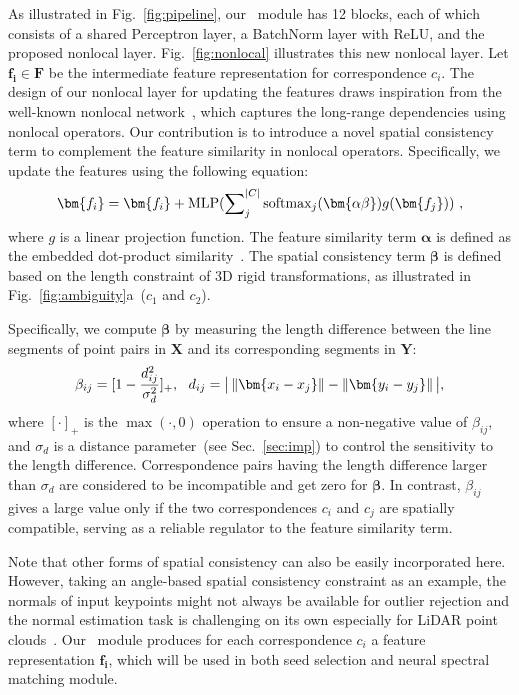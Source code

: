 {As illustrated in Fig.~\ref{fig:pipeline}}, our \nonlocal~module has 12 blocks, each of which consists of a shared Perceptron layer, a BatchNorm layer with ReLU, and the proposed nonlocal layer. Fig.~\ref{fig:nonlocal} {illustrates this new nonlocal layer}. Let $\bm{f_i} \in \bm{F}$ be the intermediate {feature} representation for correspondence $c_i$. {The design of our nonlocal layer {for updating the features} draws inspiration from the well-known nonlocal network~\cite{wang2018non}, {which captures the long-range dependencies using nonlocal operators.}
Our contribution is to introduce a novel {spatial consistency term to complement the feature similarity in nonlocal operators.}
Specifically, we update the features using the following equation:  }
\begin{equation}
\setlength\abovedisplayskip{3.5pt}\setlength\belowdisplayskip{3.5pt}
\bm{f_i} = \bm{f_i} + \text{MLP}(\sum\nolimits_{j}^{|C|}\text{softmax}_j(\bm{\alpha\beta}) g(\bm{f_j})) ~,
	\label{eq:nonlocal}
\end{equation}
where $g$ is a linear projection function. The feature similarity term $\bm{\alpha}$ is defined as the embedded dot-product similarity~\cite{wang2018non}.
The {spatial consistency} term $\bm{\beta}$ {is defined based on} the {length constraint} of 3D rigid transformations, 
as illustrated in Fig.~\ref{fig:ambiguity}a~($c_1$ and $c_2$). 


Specifically, we {compute} $\bm{\beta}$ by measuring the {length difference} {between the line segments of point pairs in $\mathbf{X}$ and its corresponding segments in $\mathbf{Y}$:} 
\begin{equation}
\setlength\abovedisplayskip{2pt}
\setlength\belowdisplayskip{2.5pt}
    \beta_{ij} = [1 - \frac{d_{ij}^2}{\sigma_d^2}]_+, ~~
d_{ij} = \big | \left\Vert \bm{x_i-x_j}\right\Vert - \left\Vert \bm{y_i-y_j}\right\Vert \big |,
    \label{eq:spatial_consistency}
\end{equation}
where $[\cdot]_+$ is the $\max (\cdot, 0)$ operation to ensure {a non-negative value of $\beta_{ij}$}, and $\sigma_d$ is a {distance} parameter~(see Sec.~\ref{sec:imp}) to control the sensitivity to the length difference. Correspondence pairs having the length difference larger than $\sigma_d$ are considered to be incompatible and get zero for $\bm{\beta}$. 
In contrast, ${\beta}_{ij}$ gives a large value only if the two correspondences {$c_i$ and $c_j$} are spatially compatible, serving as a reliable regulator to the feature similarity term. 

Note that other forms of spatial consistency can also be easily incorporated here. However, taking 
{an angle-based spatial consistency} constraint as an example, the normals of input keypoints might not {always} be available {for} outlier rejection and the normal estimation {task is challenging on its own} especially for LiDAR point clouds~\cite{zhao2019robust}.
Our \nonlocal~module produces {for each correspondence $c_i$} a feature representation $\bm{f_i}$, which will be used in both seed selection and neural spectral matching module.


